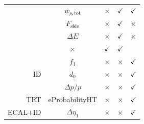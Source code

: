 \documentclass[10pt, compress,spanish]{beamer}
\begin{document}
\begin{frame}[fragile]
\begin{columns}
\begin{column}{0.6\textwidth}
\begin{table}
{\begin{tabular}{ r c | c c | c }
    &  $w_{s,\text{tot}}$ & $\times$ & $\checkmark$ & $\checkmark$ \\

    & $F_{\text{side}}$ & $\times$ & $\checkmark$ & $\times$ \\

    & $\Delta E$ & $\times$ & $\checkmark$ & $\times$ \\

    &  $\times$ & $\checkmark$ & $\checkmark$  \\

    &  $f_{1}$ & $\times$ & $\times$ & $\checkmark$  \\

  ID &  $d_{0}$ & $\times$ & $\times$ & $\checkmark$ \\

    &  $\Delta p/p$ & $\times$ & $\times$ & $\checkmark$  \\

  TRT &  eProbabilityHT & $\times$ & $\times$ & $\checkmark$  \\

  ECAL+ID &  $\Delta\eta_{1}$ & $\times$ & $\times$ & $\checkmark$ \\

  \hline

\end{tabular}}
\end{table}

\end{column}


\begin{column}{0.3\textwidth}


\end{column}
\end{columns}
\end{frame}
\end{document}
